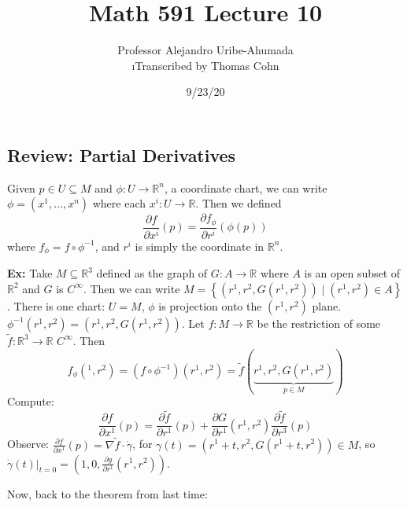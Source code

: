 \documentclass[10pt,letterpaper]{article}
\author{Professor Alejandro Uribe-Ahumada\\ \small\i{Transcribed by Thomas Cohn}}
\title{Math 591 Lecture 10}
\date{9/23/20} %
\newcommand{\n}{\hfill\break}
\newcommand{\nn}{\vspace{0.5\baselineskip}\n}
\newcommand{\hangblock}[2]{\par\noindent\settowidth{\hangindent}{\textbf{#1: }}\textbf{#1: }\!\!\!#2}
\newcommand{\ex}[1]{\hangblock{Ex}{#1}}
\newcommand{\set}[1]{\left\{#1\right\}}
\newcommand{\reals}{\mathbb{R}}
\newcommand{\R}{\reals}
\newcommand{\inv}{^{-1}}
\newcommand{\of}{\circ}
\newcommand{\restr}[2]{\left.#1\right|_{#2}}
\newcommand{\pd}[2]{\frac{\partial{}#1}{\partial{}#2}}
\newcommand{\del}{\nabla}
\begin{document}
\maketitle
\setlength\RaggedRightParindent{\parindent}
\RaggedRight

\subsection*{Review: Partial Derivatives}

\par\noindent
Given $p\in{}U\subseteq{}M$ and $\phi:U\to\R^{n}$, a coordinate chart, we can write $\phi=(x^{1},\ldots,x^{n})$ where each $x^{i}:U\to\R$. Then we defined
\[
	\pd{f}{x^{i}}(p)=\pd{f_{\phi}}{r^{i}}(\phi(p))
\]
where $f_{\phi}=f\of\phi\inv$, and $r^{i}$ is simply the coordinate in $\R^{n}$.\n

\ex{
	Take $M\subseteq\R^{3}$ defined as the graph of $G:A\to\R$ where $A$ is an open subset of $\R^{2}$ and $G$ is $C^{\infty}$. Then we can write $M=\set{(r^{1},r^{2},G(r^{1},r^{2}))\mid{}(r^{1},r^{2})\in{}A}$. There is one chart: $U=M$, $\phi$ is projection onto the $(r^{1},r^{2})$ plane. $\phi\inv(r^{1},r^{2})=(r^{1},r^{2},G(r^{1},r^{2}))$.\nn
	Let $f:M\to\R$ be the restriction of some $\tilde{f}:\R^{3}\to\R$ $C^{\infty}$. Then
	\[
		f_{\phi}(^{1},r^{2})=(f\of\phi\inv)(r^{1},r^{2})=\tilde{f}(\underbrace{r^{1},r^{2},G(r^{1},r^{2})}_{p\in{}M})
	\]
	Compute:
	\[
		\pd{f}{x^{1}}(p)=\pd{\tilde{f}}{r^{1}}(p)+\pd{G}{r^{1}}(r^{1},r^{2})\pd{\tilde{f}}{r^{3}}(p)
	\]
	Observe: $\pd{f}{x^{1}}(p)=\del\tilde{f}\cdot\dot\gamma$, for $\gamma(t)=(r^{1}+t,r^{2},G(r^{1}+t,r^{2}))\in{}M$, so $\restr{\dot\gamma(t)}{t=0}=(1,0,\pd{g}{r^{1}}(r^{1},r^{2}))$.\n
}

\par\noindent
Now, back to the theorem from last time:\n
\end{document}
